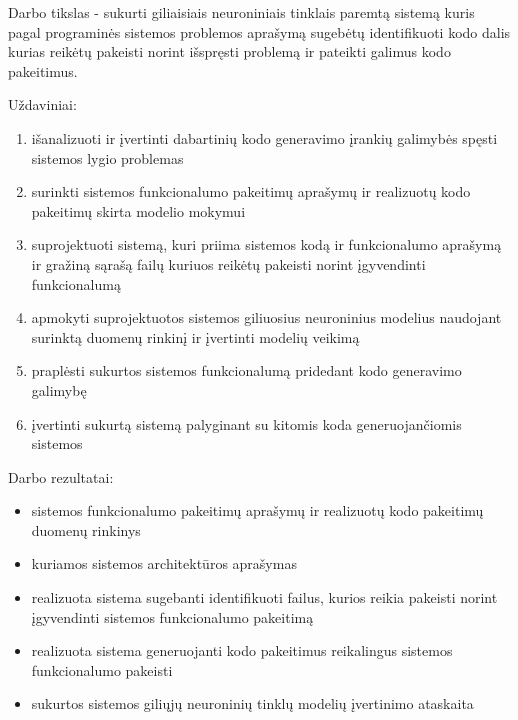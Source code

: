 \documentclass{VUMIFPSbakalaurinis}
\begin{document}
Darbo tikslas - sukurti giliaisiais neuroniniais tinklais paremtą sistemą kuris pagal programinės sistemos problemos aprašymą sugebėtų identifikuoti kodo dalis kurias reikėtų pakeisti norint išspręsti problemą ir pateikti galimus kodo pakeitimus.

Uždaviniai:
\begin{enumerate}
    \item išanalizuoti ir įvertinti dabartinių kodo generavimo įrankių galimybės spęsti sistemos lygio problemas
    \item surinkti sistemos funkcionalumo pakeitimų aprašymų ir realizuotų kodo pakeitimų skirta modelio mokymui
    \item suprojektuoti sistemą, kuri priima sistemos kodą ir funkcionalumo aprašymą ir gražiną sąrašą failų kuriuos reikėtų pakeisti norint įgyvendinti funkcionalumą
    \item apmokyti suprojektuotos sistemos giliuosius neuroninius modelius naudojant surinktą duomenų rinkinį ir įvertinti modelių veikimą
    \item praplėsti sukurtos sistemos funkcionalumą pridedant kodo generavimo galimybę
    \item įvertinti sukurtą sistemą palyginant su kitomis koda generuojančiomis sistemos
\end{enumerate}


Darbo rezultatai:
\begin{itemize}
    \item sistemos funkcionalumo pakeitimų aprašymų ir realizuotų kodo pakeitimų duomenų rinkinys
    \item kuriamos sistemos architektūros aprašymas
    \item realizuota sistema sugebanti identifikuoti failus, kurios reikia pakeisti norint įgyvendinti sistemos funkcionalumo pakeitimą
    \item realizuota sistema generuojanti kodo pakeitimus reikalingus sistemos funkcionalumo pakeisti
    \item sukurtos sistemos giliųjų neuroninių tinklų modelių įvertinimo ataskaita
\end{itemize}


\end{document}
